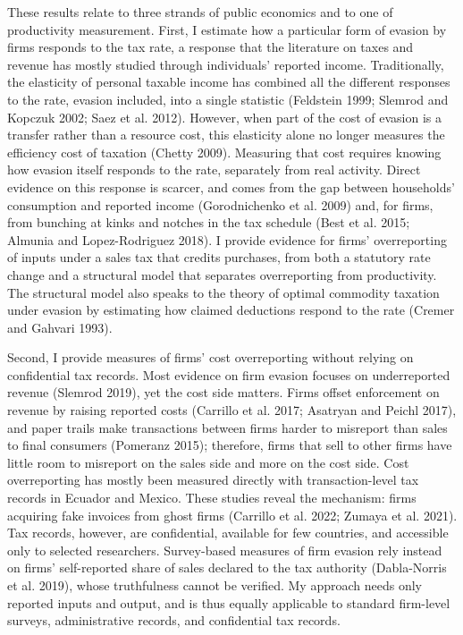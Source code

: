 \documentclass[
  12pt]{article}
\begin{document}
These results relate to three strands of public economics and to one of
productivity measurement. First, I estimate how a particular form of
evasion by firms responds to the tax rate, a response that the
literature on taxes and revenue has mostly studied through individuals'
reported income. Traditionally, the elasticity of personal taxable
income has combined all the different responses to the rate, evasion
included, into a single statistic (Feldstein 1999; Slemrod and Kopczuk
2002; Saez et al. 2012). However, when part of the cost of evasion is a
transfer rather than a resource cost, this elasticity alone no longer
measures the efficiency cost of taxation (Chetty 2009). Measuring that
cost requires knowing how evasion itself responds to the rate,
separately from real activity. Direct evidence on this response is
scarcer, and comes from the gap between households' consumption and
reported income (Gorodnichenko et al. 2009) and, for firms, from
bunching at kinks and notches in the tax schedule (Best et al. 2015;
Almunia and Lopez-Rodriguez 2018). I provide evidence for firms'
overreporting of inputs under a sales tax that credits purchases, from
both a statutory rate change and a structural model that separates
overreporting from productivity. The structural model also speaks to the
theory of optimal commodity taxation under evasion by estimating how
claimed deductions respond to the rate (Cremer and Gahvari 1993).

Second, I provide measures of firms' cost overreporting without relying
on confidential tax records. Most evidence on firm evasion focuses on
underreported revenue (Slemrod 2019), yet the cost side matters. Firms
offset enforcement on revenue by raising reported costs (Carrillo et al.
2017; Asatryan and Peichl 2017), and paper trails make transactions
between firms harder to misreport than sales to final consumers
(Pomeranz 2015); therefore, firms that sell to other firms have little
room to misreport on the sales side and more on the cost side. Cost
overreporting has mostly been measured directly with transaction-level
tax records in Ecuador and Mexico. These studies reveal the mechanism:
firms acquiring fake invoices from ghost firms (Carrillo et al. 2022;
Zumaya et al. 2021). Tax records, however, are confidential, available
for few countries, and accessible only to selected researchers.
Survey-based measures of firm evasion rely instead on firms'
self-reported share of sales declared to the tax authority (Dabla-Norris
et al. 2019), whose truthfulness cannot be verified. My approach needs
only reported inputs and output, and is thus equally applicable to
standard firm-level surveys, administrative records, and confidential
tax records.
\end{document}
